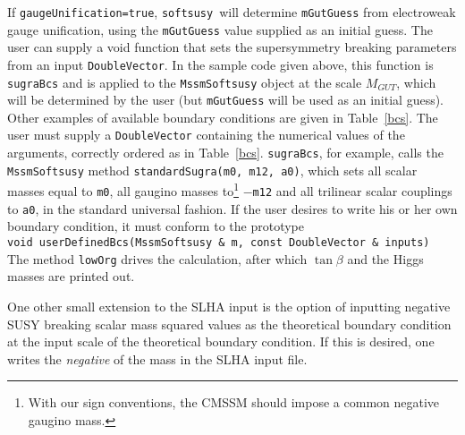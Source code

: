 \documentclass[]{article}
\def\code#1{\small{\tt #1}\normalsize}
\begin{document}
If \code{gaugeUnification=true}, \code{softsusy}~will determine
\code{mGutGuess} from electroweak gauge unification, using
the \code{mGutGuess} value supplied as an initial guess. 
The user can supply a void function that sets the supersymmetry breaking
parameters from an input \code{DoubleVector}. In the sample code given above,
this function is
\code{sugraBcs} and is applied to the \code{MssmSoftsusy} object at the
scale $M_{GUT}$, which will be determined by the user (but \code{mGutGuess}
will be
used as an initial guess). 
Other examples of available boundary conditions are given in
Table~\ref{bcs}. 
The user must supply a \code{DoubleVector} containing the
numerical values of the arguments, correctly ordered as in
Table~\ref{bcs}.
\code{sugraBcs}, for example, calls the \code{MssmSoftsusy} method
\code{standardSugra(m0, m12, a0)}, which sets all scalar masses equal to
\code{m0}, 
all gaugino masses to\footnote{With our sign conventions, the CMSSM should
  impose a common negative gaugino mass.} $-$\code{m12} and all trilinear
scalar couplings to 
\code{a0}, in the standard universal fashion. 
If the user desires to write his or her own boundary condition, it must
conform to the prototype\\
\code{void userDefinedBcs(MssmSoftsusy \& m, const DoubleVector \& inputs)}\\
The method \code{lowOrg} drives the calculation, after which $\tan \beta$ and
the Higgs masses are
printed out.

One other small extension to the SLHA input is the option of inputting
negative SUSY breaking scalar mass squared values as the theoretical boundary
condition at the input scale of the theoretical boundary condition. If this is
desired, one writes the {\em negative} of the mass in the SLHA input file.
\end{document}
